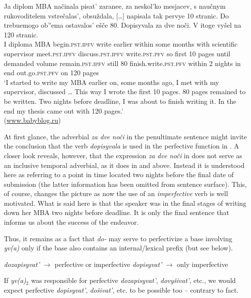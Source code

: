 \documentclass[output=paper,
colorlinks,
citecolor=brown,
newtxmath
]{langscibook}
\begin{document}
\ea\label{mba}
\gll Ja diplom MBA načinala pisat' zaranee, za neskol'ko mesjacev, s naučnym rukovoditelem vstrečalas', obsuždala, [\dots] napisala tak pervye 10 stranic. Do trebuemogo ob''ema ostavalos' ešče 80. Dopisyvala za dve noči. V itoge vyšel na 120 stranic.\\
I diploma MBA begin.\textsc{pst.ipfv} write earlier within some months with scientific supervisor meet.\textsc{pst.ipfv} discuss.\textsc{pst.ipfv} {} write.\textsc{pst.pfv} so first 10 pages until demanded volume remain.\textsc{pst.ipfv} still 80 {finish.write.}\textsc{pst.pfv} within 2 nights in end {out.go.}\textsc{pst.pfv} on 120 pages\\
\glt `I started to write my MBA earlier on, some months ago, I met with my supervisor, discussed {\dots} This way I wrote the first 10 pages. 80 pages remained to be written. Two nights before deadline, I was about to finish writing it. In the end my thesis came out with 120 pages.'\\ \hfill (\url{www.babyblog.ru})
\z

\noindent At first glance, the adverbial \textit{za dve noči} in the penultimate sentence might invite the conclusion that the verb \textit{dopisyvala} is used in the perfective function in . A closer look reveals, however, that the expression \textit{za dve noči} in  does not serve as an inclusive temporal adverbial, as it does in  and  above. Instead it is understood here as referring to a point in time located two nights before the final date of submission (the latter information has been omitted from sentence surface). This, of course, changes the picture as now the use of an \emph{imperfective} verb is well motivated. What is said here is that
the speaker was in the final stages of writing down her MBA two nights before deadline. It is only the final sentence that informs us about the success of the endeavor.

Thus, it remains as a fact that \textit{do-} may serve to perfectivize a base involving \textit{yv(a)} only if the base also contains an internal/lexical prefix (but see below).

\ea \label{popo}
\ea
\textit{dozapisyvat'} $\rightarrow$ perfective or imperfective
\ex \textit{dopisyvat'} $\rightarrow$ only imperfective
\z\z

\noindent If \textit{yv(a)}$_2$ was responsible for perfective \textit{dozapisyvat'}, \textit{dovyšivat'}, etc., we would expect perfective \textit{dopisyvat'}, \textit{došivat'}, etc. to be possible too -- contrary to fact.
\end{document}
